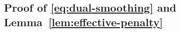 
\ifsupp
\subsection{Proof of \texorpdfstring{\eqref{eq:dual-smoothing} and}{dual smoothing and} Lemma~\ref{lem:effective-penalty}}
\label{app:effective-penalty}

